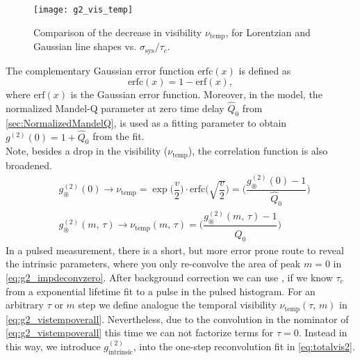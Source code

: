 \begin{figure}[htp]
	\centering
	\texttt{[image: g2\_vis\_temp]}
	\caption{Comparison of the decrease in visibility $\nu_\mathrm{temp}$, for Lorentzian and Gaussian line shapes vs. $\sigma_\mathrm{sys}/\tau_c$.}
	\label{fig:Deconvolution}
\end{figure}
\noindent The complementary Gaussian error function $\mathrm{erfc}(x)$ is defined as
\begin{equation}\label{eq:erfc}
	\mathrm{erfc}(x)=1-\mathrm{erf}(x),
\end{equation}
where $\mathrm{erf}(x)$ is the Gaussian error function.
Moreover, in the model, the normalized Mandel-Q parameter at zero time delay $\hat{Q}_0$ \cite{xin-zheng_characterization_2008} from \cref{sec:NormalizedMandelQ}, is used as a fitting parameter to obtain $g^{(2)}(0)=1+\hat{Q}_0$ from the fit.\\
Note, besides a drop in the visibility ($\nu_\mathrm{temp}$), the correlation function is also broadened.
\begin{align}
&g^{(2)}_\circledast(0)\rightarrow\nu_\mathrm{temp}=\exp \Big( \dfrac{v}{2} \Big) \cdot\mathrm{erfc}\Big( \sqrt{\dfrac{v}{2}}\Big)=\Big(\dfrac{g^{(2)}_\circledast(0)-1}{\hat{Q}_0} \Big)\label{eq:g2_impdeconvzero}\\
&g^{(2)}_\circledast(m,\,\tau)\rightarrow\nu_\mathrm{temp}(m,\,\tau)=\Big(\dfrac{g^{(2)}_\circledast(m,\,\tau)-1}{\hat{Q}_0} \Big)\label{eq:g2_vistempoverall}
\end{align}
In a pulsed measurement, there is a short, but more error prone route to reveal the intrinsic parameters, where you only re-convolve the area of peak $m=0$ in \cref{eq:g2_impdeconvzero}. After background correction we can use , if we know $\tau_c$ from a exponential lifetime fit to a pulse in the pulsed histogram.
For an arbitrary $\tau$ or $m$ step we define analogue the temporal visibility $\nu_\mathrm{temp}(\tau,\, m)$ in \cref{eq:g2_vistempoverall}. Nevertheless, due to the convolution in the nominator of \cref{eq:g2_vistempoverall} this time we can not factorize terms for $\tau=0$. Instead in this way, we introduce $g^{(2)}_\mathrm{intrinsic}$, into the one-step reconvolution fit in \cref{eq:totalvis2}.

